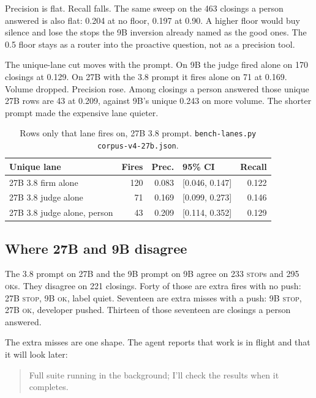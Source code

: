 Precision is flat. Recall falls. The same sweep on the 463 closings a
person answered is also flat: 0.204 at no floor, 0.197 at 0.90. A
higher floor would buy silence and lose the stops the 9B inversion
already named as the good ones. The 0.5 floor stays as a router into
the proactive question, not as a precision tool.

The unique-lane cut moves with the prompt. On 9B the judge fired alone on
170 closings at 0.129. On 27B with the 3.8 prompt it fires alone on 71
at 0.169. Volume dropped. Precision rose. Among closings a person
answered those unique 27B rows are 43 at 0.209, against 9B's unique
0.243 on more volume. The shorter prompt made the expensive lane
quieter.

\begin{table}[ht]
\centering
{\small\begin{tabular}{lrrlr}
\toprule
Unique lane & Fires & Prec. & 95\% CI & Recall \\
\midrule
27B 3.8 firm alone & 120 & 0.083 & [0.046, 0.147] & 0.122 \\
27B 3.8 judge alone & 71 & 0.169 & [0.099, 0.273] & 0.146 \\
27B 3.8 judge alone, person & 43 & 0.209 & [0.114, 0.352] & 0.129 \\
\bottomrule
\end{tabular}}
\caption{Rows only that lane fires on, 27B 3.8 prompt.
\texttt{bench-lanes.py corpus-v4-27b.json}.}
\label{tab:unique27}
\end{table}



\subsection{Where 27B and 9B disagree}
\label{sec:disagree}

The 3.8 prompt on 27B and the 9B prompt on 9B agree on 233
\textsc{stop}s and 295 \textsc{ok}s. They disagree on 221 closings.
Forty of those are extra fires with no push: 27B \textsc{stop}, 9B
\textsc{ok}, label quiet. Seventeen are extra misses with a push: 9B
\textsc{stop}, 27B \textsc{ok}, developer pushed. Thirteen of those
seventeen are closings a person answered.

The extra misses are one shape. The agent reports that work is in
flight and that it will look later:

\begin{quote}
\ttfamily\small
Full suite running in the background; I'll check the results when it
completes.
\end{quote}

